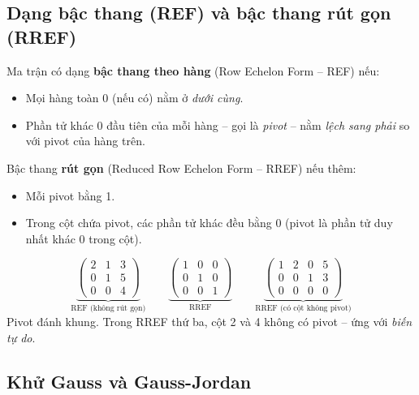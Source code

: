\documentclass[12pt,a4paper]{article}
\begin{document}
\subsection{Dạng bậc thang (REF) và bậc thang rút gọn (RREF)}

\begin{dinhnghia}
  Ma trận có dạng \textbf{bậc thang theo hàng} (Row Echelon Form -- REF) nếu:
  \begin{itemize}
    \item Mọi hàng toàn 0 (nếu có) nằm ở \emph{dưới cùng}.
    \item Phần tử khác 0 đầu tiên của mỗi hàng -- gọi là \emph{pivot} -- nằm \emph{lệch sang phải} so với pivot của hàng trên.
  \end{itemize}

  Bậc thang \textbf{rút gọn} (Reduced Row Echelon Form -- RREF) nếu thêm:
  \begin{itemize}
    \item Mỗi pivot bằng 1.
    \item Trong cột chứa pivot, các phần tử khác đều bằng 0 (pivot là phần tử duy nhất khác 0 trong cột).
  \end{itemize}
\end{dinhnghia}

\begin{vidu}[title={Ví dụ về REF và RREF}]
\[
  \underbrace{\begin{pmatrix}\boxed{2} & 1 & 3 \\ 0 & \boxed{1} & 5 \\ 0 & 0 & \boxed{4}\end{pmatrix}}_{\text{REF (không rút gọn)}}
  \qquad
  \underbrace{\begin{pmatrix}\boxed{1} & 0 & 0 \\ 0 & \boxed{1} & 0 \\ 0 & 0 & \boxed{1}\end{pmatrix}}_{\text{RREF}}
  \qquad
  \underbrace{\begin{pmatrix}\boxed{1} & 2 & 0 & 5 \\ 0 & 0 & \boxed{1} & 3 \\ 0 & 0 & 0 & 0\end{pmatrix}}_{\text{RREF (có cột không pivot)}}
\]
Pivot đánh khung. Trong RREF thứ ba, cột 2 và 4 không có pivot -- ứng với \emph{biến tự do}.
\end{vidu}

\subsection{Khử Gauss và Gauss-Jordan}
\end{document}
